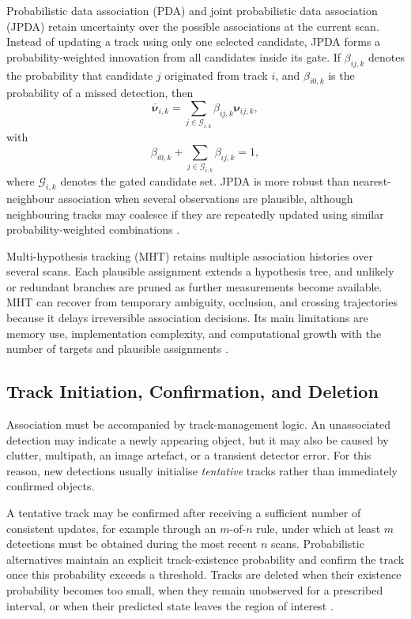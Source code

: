 \documentclass[graybox,envcountchap]{style/SNmono}
\begin{document}
Probabilistic data association (PDA) and joint probabilistic data
association (JPDA) retain uncertainty over the possible associations at
the current scan. Instead of updating a track using only one selected
candidate, JPDA forms a probability-weighted innovation from all candidates
inside its gate. If $\beta_{ij,k}$ denotes the probability that candidate
$j$ originated from track $i$, and $\beta_{i0,k}$ is the probability of a
missed detection, then
\begin{equation}
\overline{\boldsymbol{\nu}}_{i,k}=\sum_{j\in\mathcal{G}_{i,k}}\beta_{ij,k}\boldsymbol{\nu}_{ij,k},
\label{eq:jpda-innovation}
\end{equation}
with
\begin{equation}
\beta_{i0,k}+\sum_{j\in\mathcal{G}_{i,k}}\beta_{ij,k}=1,
\label{eq:jpda-probability}
\end{equation}
where $\mathcal{G}_{i,k}$ denotes the gated candidate set. JPDA is more
robust than nearest-neighbour association when several observations are
plausible, although neighbouring tracks may coalesce if they are repeatedly
updated using similar probability-weighted combinations
\cite{barshalom1995multitarget,blackman1999design,
barshalom2011tracking}.

Multi-hypothesis tracking (MHT) retains multiple association histories over
several scans. Each plausible assignment extends a hypothesis tree, and
unlikely or redundant branches are pruned as further measurements become
available. MHT can recover from temporary ambiguity, occlusion, and crossing
trajectories because it delays irreversible association decisions. Its main
limitations are memory use, implementation complexity, and computational
growth with the number of targets and plausible assignments
\cite{reid1979algorithm,blackman1999design,barshalom2011tracking}.


\subsection{Track Initiation, Confirmation, and Deletion}


Association must be accompanied by track-management logic. An unassociated
detection may indicate a newly appearing object, but it may also be caused
by clutter, multipath, an image artefact, or a transient detector error.
For this reason, new detections usually initialise \emph{tentative} tracks
rather than immediately confirmed objects.

A tentative track may be confirmed after receiving a sufficient number of
consistent updates, for example through an $m$-of-$n$ rule, under which at
least $m$ detections must be obtained during the most recent $n$ scans.
Probabilistic alternatives maintain an explicit track-existence
probability and confirm the track once this probability exceeds a
threshold. Tracks are deleted when their existence probability becomes too
small, when they remain unobserved for a prescribed interval, or when their
predicted state leaves the region of interest
\cite{blackman1999design,barshalom2011tracking}.
\end{document}
